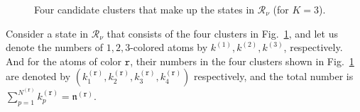 \documentclass[12pt,a4paper]{article}
\newcommand{\nn}{\mathfrak{n}}
\renewcommand{\(}{\left(}
\renewcommand{\)}{\right)}
\renewcommand{\(}{\left(}
\renewcommand{\)}{\right)}
\begin{document}
\begin{figure}[h]
\begin{subfigure}[b]{0.25\textwidth}
\caption{}
\end{subfigure}
\begin{subfigure}[b]{.22\textwidth}
\centering
{}
\caption{}
\end{subfigure}
\caption{Four candidate clusters that make up the states in $\mathcal{R}_\nu$ (for $K=3$).}
\label{fig:k=3_paths}
\end{figure}



Consider a state in $\mathcal{R}_\nu$ that consists of the four clusters  in Fig.~\ref{fig:k=3_paths}, and let us denote the numbers of $1,2,3$-colored atoms by $k^{(1)},k^{(2)},k^{(3)}$, respectively. 
And for the atoms of color $\texttt{r}$, their numbers in the four clusters shown in Fig.~\ref{fig:k=3_paths} are denoted by $(k^{(\texttt{r})}_1,k^{(\texttt{r})}_2,k^{(\texttt{r})}_3,k^{(\texttt{r})}_4)$ respectively, and the total number is $\sum_{p=1}^{N^{(\texttt{r})}} k^{(\texttt{r})}_p=\nn^{(\texttt{r})}$. 

\medskip
	
\end{document}
